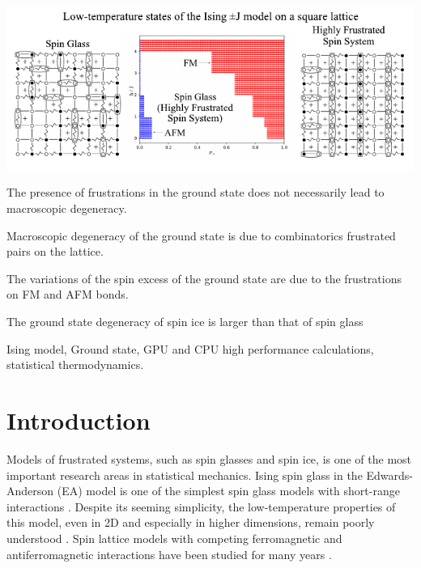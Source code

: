 \documentclass[preprint,12pt]{elsarticle}
\begin{document}
\begin{frontmatter}
\begin{graphicalabstract}
\includegraphics[width=1.2\linewidth]{Graphical Abstract.pdf}
\end{graphicalabstract}


\begin{highlights}  
	\item The presence of frustrations in the ground state does not necessarily lead to macroscopic degeneracy.
	\item Macroscopic degeneracy of the ground state is due to combinatorics frustrated pairs on the lattice.
	\item The variations of the spin excess of the ground state are due to the frustrations on FM and AFM bonds. 
	\item The ground state degeneracy of spin ice is larger than that of spin glass
\end{highlights}  


\begin{keyword}
	Ising model, Ground state, GPU and CPU high performance calculations, statistical thermodynamics.
\end{keyword}


\end{frontmatter}

\linenumbers

\newpage
\tableofcontents

\newpage
\section{Introduction}

Models of frustrated systems, such as spin glasses and spin ice, is one of the most important research areas in statistical mechanics. Ising spin glass in the Edwards-Anderson (EA) model is one of the simplest spin glass models with short-range interactions \cite{edwards1975theory}. Despite its seeming simplicity, the low-temperature properties of this model, even in 2D and especially in higher dimensions, remain poorly understood \cite{pal1996ground, hartmann2011ground, newman2022ground}. Spin lattice models with competing ferromagnetic and antiferromagnetic interactions have been studied for many years \cite{binder1986spin, mezard1987spin, lebrecht2004plaquette, valdes2012j, lebrecht2015j, fan2023searching}.
\end{document}
